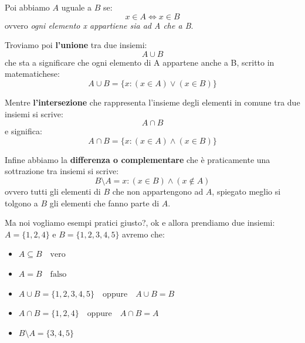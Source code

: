\documentclass{article}
\theoremstyle{definition}
\begin{document}
Poi abbiamo $A$ uguale a $B$ se:
\begin{equation}
        x \in A \Leftrightarrow x \in B
\end{equation}
ovvero \textit{ogni elemento x appartiene sia ad A che a B}. \newline

Troviamo poi \textbf{l'unione} tra due insiemi: 
\begin{equation}\label{eq:def_unione}
        A \cup B 
\end{equation}
che sta a significare che ogni elemento di A appartene anche a B, scritto in matematichese:
\begin{equation}
        A \cup B = \{x : (x \in A) \vee (x \in B)\}
\end{equation} \newline


Mentre \textbf{l'intersezione} che rappresenta l'insieme degli elementi in comune tra due insiemi si scrive: 
\begin{equation}
        A \cap B
\end{equation}
e significa:
\begin{equation}
        A \cap B = \{x : (x \in A) \wedge (x \in B)\}
\end{equation} \newline

Infine abbiamo la \textbf{differenza o complementare} che è praticamente una sottrazione tra insiemi si scrive:
\begin{equation}
        B \setminus A = {x : (x \in B) \wedge (x \notin A)}
\end{equation}
ovvero tutti gli elementi di $B$ che non appartengono ad $A$, spiegato meglio si tolgono a $B$ gli elementi che fanno parte di $A$. \newline

Ma noi vogliamo esempi pratici giusto?, ok e  allora prendiamo due insiemi: $A = \{1,2,4\}$ e $B = \{1,2,3,4,5\}$ avremo che:
\begin{itemize}
        \item $A \subseteq B \quad \mbox{vero}$ 
        \item $A = B \quad \mbox{falso}$
        \item $A \cup B = \{1, 2, 3, 4, 5\} \quad \mbox{oppure} \quad A \cup B = B$
        \item $A \cap B = \{1, 2, 4\} \quad \mbox{oppure} \quad A \cap B = A$
        \item $B \setminus A = \{3, 4, 5\}$
\end{itemize}
\end{document}
